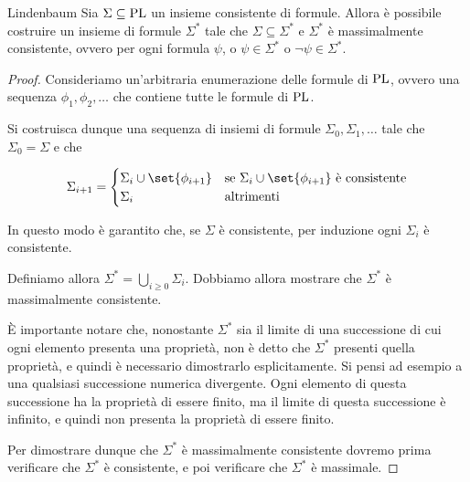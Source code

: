 \begin{lemma}[namedlabel={lem:lindenbaum}{Lindenbaum}]{Lindenbaum}
  Sia \(\Sigma\subseteq\operatorname{PL}\) un insieme consistente di formule. Allora è possibile costruire un insieme di formule \(\Sigma^*\) tale che \(\Sigma\subseteq\Sigma^*\) e \(\Sigma^*\) è massimalmente consistente, ovvero per ogni formula \(\psi\), o \(\psi\in\Sigma^*\) o \(\neg\psi\in\Sigma^*\).
\end{lemma}

\begin{proof}
  Consideriamo un'arbitraria enumerazione delle formule di \(\operatorname{PL}\), ovvero una sequenza \(\phi_1,\phi_2,\ldots\) che contiene tutte le formule di \(\operatorname{PL}\).
  
  Si costruisca dunque una sequenza di insiemi di formule \(\Sigma_0,\Sigma_1,\ldots\) tale che \(\Sigma_0 = \Sigma\) e che
  
  \[ \Sigma_{i+1} = \begin{cases}
                      \Sigma_i\cup\set{\phi_{i+1}} & \text{se } \Sigma_i\cup\set{\phi_{i+1}} \text{ è consistente} \\
                      \Sigma_i & \text{altrimenti}
                    \end{cases}
                    \]

  In questo modo è garantito che, se \(\Sigma\) è consistente, per induzione ogni \(\Sigma_i\) è consistente.

  Definiamo allora \(\Sigma^* = \bigcup_{i\geq 0}\Sigma_i\). Dobbiamo allora mostrare che \(\Sigma^*\) è massimalmente consistente.

  È importante notare che, nonostante \(\Sigma^*\) sia il limite di una successione di cui ogni elemento presenta una proprietà, non è detto che \(\Sigma^*\) presenti quella proprietà, e quindi è necessario dimostrarlo esplicitamente. Si pensi ad esempio a una qualsiasi successione numerica divergente. Ogni elemento di questa successione ha la proprietà di essere finito, ma il limite di questa successione è infinito, e quindi non presenta la proprietà di essere finito.

  Per dimostrare dunque che \(\Sigma^*\) è massimalmente consistente dovremo prima verificare che \(\Sigma^*\) è consistente, e poi verificare che \(\Sigma^*\) è massimale.


\end{proof}
